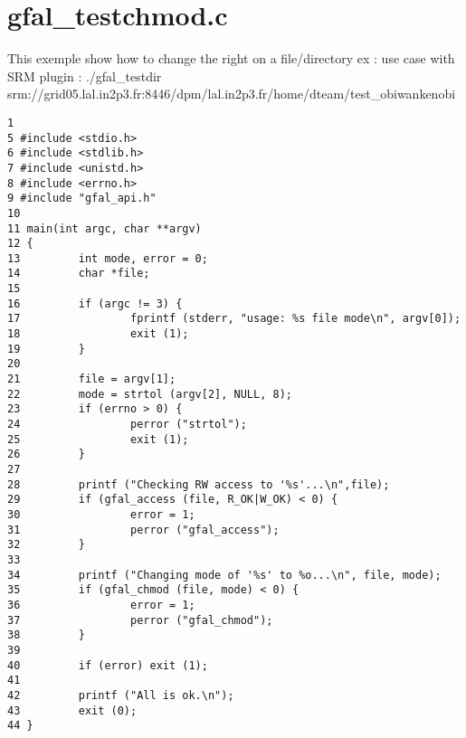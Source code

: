 \section{gfal\_\-testchmod.c}
This exemple show how to change the right on a file/directory ex : use case with SRM plugin : ./gfal\_\-testdir srm://grid05.lal.in2p3.fr:8446/dpm/lal.in2p3.fr/home/dteam/test\_\-obiwankenobi



\begin{DocInclude}\begin{verbatim}1 
5 #include <stdio.h>
6 #include <stdlib.h>
7 #include <unistd.h>
8 #include <errno.h>
9 #include "gfal_api.h"
10 
11 main(int argc, char **argv)
12 {
13         int mode, error = 0;
14         char *file;
15 
16         if (argc != 3) {
17                 fprintf (stderr, "usage: %s file mode\n", argv[0]);
18                 exit (1);
19         }
20 
21         file = argv[1];
22         mode = strtol (argv[2], NULL, 8);
23         if (errno > 0) {
24                 perror ("strtol");
25                 exit (1);
26         }
27 
28         printf ("Checking RW access to '%s'...\n",file);
29         if (gfal_access (file, R_OK|W_OK) < 0) {
30                 error = 1;
31                 perror ("gfal_access");
32         }
33 
34         printf ("Changing mode of '%s' to %o...\n", file, mode);
35         if (gfal_chmod (file, mode) < 0) {
36                 error = 1;
37                 perror ("gfal_chmod");
38         }
39 
40         if (error) exit (1);
41 
42         printf ("All is ok.\n");
43         exit (0);
44 }
\end{verbatim}
\end{DocInclude}
 